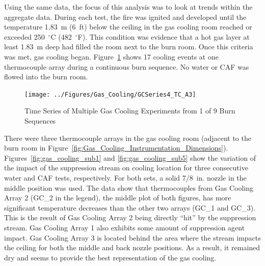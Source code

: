 \documentclass[12pt,oneside]{book}
\begin{document}
Using the same data, the focus of this analysis was to look at trends within the aggregate data. During each test, the fire was ignited and developed until the temperature 1.83~m (6~ft) below the ceiling in the gas cooling room reached or exceeded 250~$^{\circ}$C (482~$^{\circ}$F).  This condition was evidence that a hot gas layer at least 1.83~m deep had filled the room next to the burn room.  Once this criteria was met, gas cooling began. Figure~\ref{fig:gas_cooling_exp4} shows 17 cooling events at one thermocouple array during a continuous burn sequence.  No water or CAF was flowed into the burn room.   

\begin{figure}[ht!]
	\texttt{[image: ../Figures/Gas\_Cooling/GCSeries4\_TC\_A3]}
	\caption{Time Series of Multiple Gas Cooling Experiments from 1 of 9 Burn Sequences}
	\label{fig:gas_cooling_exp4}
\end{figure}

There were three thermocouple arrays in the gas cooling room (adjacent to the burn room in Figure~\ref{fig:Gas_Cooling_Instrumentation_Dimensions}). Figures~\ref{fig:gas_cooling_sub1} and \ref{fig:gas_cooling_sub5} show the variation of the impact of the suppression stream on cooling location for three consecutive water and CAF tests, respectively. For both sets, a solid 7/8~in. nozzle in the middle position was used. The data show that thermocouples from Gas Cooling Array 2 (GC\_2 in the legend), the middle plot of both figures, has more significant temperature decreases than the other two arrays (GC\_1 and GC\_3). This is the result of Gas Cooling Array 2 being directly ``hit'' by the suppression stream.  Gas Cooling Array 1 also exhibits some amount of suppression agent impact.  Gas Cooling Array 3 is located behind the area where the stream impacts the ceiling for both the middle and back nozzle positions.  As a result, it remained dry and seems to provide the best representation of the gas cooling.   
\end{document}
